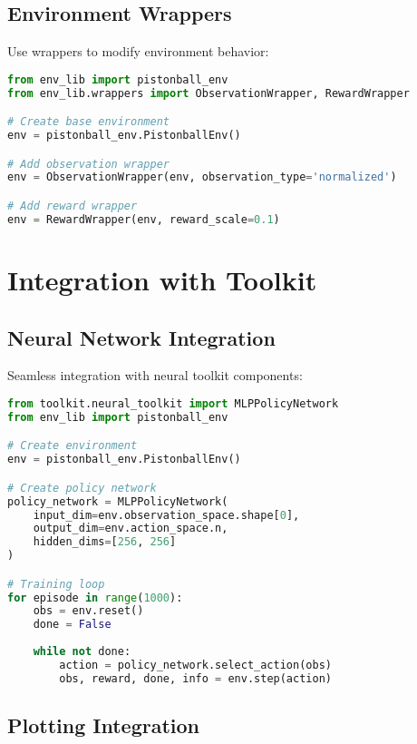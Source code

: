 \subsection{Environment Wrappers}

Use wrappers to modify environment behavior:

\begin{lstlisting}[language=python, caption=Environment Wrappers]
from env_lib import pistonball_env
from env_lib.wrappers import ObservationWrapper, RewardWrapper

# Create base environment
env = pistonball_env.PistonballEnv()

# Add observation wrapper
env = ObservationWrapper(env, observation_type='normalized')

# Add reward wrapper
env = RewardWrapper(env, reward_scale=0.1)
\end{lstlisting}

\section{Integration with Toolkit}

\subsection{Neural Network Integration}

Seamless integration with neural toolkit components:

\begin{lstlisting}[language=python, caption=Neural Network Integration]
from toolkit.neural_toolkit import MLPPolicyNetwork
from env_lib import pistonball_env

# Create environment
env = pistonball_env.PistonballEnv()

# Create policy network
policy_network = MLPPolicyNetwork(
    input_dim=env.observation_space.shape[0],
    output_dim=env.action_space.n,
    hidden_dims=[256, 256]
)

# Training loop
for episode in range(1000):
    obs = env.reset()
    done = False
    
    while not done:
        action = policy_network.select_action(obs)
        obs, reward, done, info = env.step(action)
\end{lstlisting}

\subsection{Plotting Integration}

